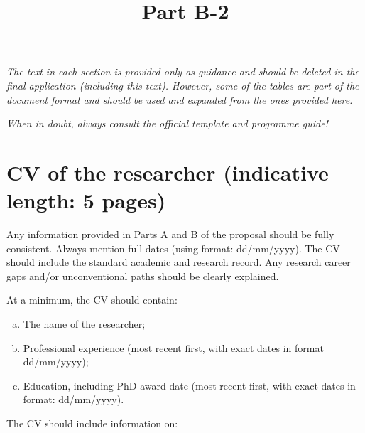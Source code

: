 \documentclass[11pt,draftproposal]{msca-pf}
\title{Part B-2}
\author{}
\date{}
\begin{document}
\maketitle

\textit{The text in each section is provided only as guidance and should be deleted
in the final application (including this text). However, some of the tables
are part of the document format and should be used and expanded from the ones
provided here.}

\textit{When in doubt, always consult the official template and programme guide!}

\section{CV of the researcher (indicative length: 5 pages)}

Any information provided in Parts A and B of the proposal should be fully consistent.
Always mention full dates (using format: dd/mm/yyyy). The CV should include the
standard academic and research record. Any research career gaps and/or unconventional
paths should be clearly explained.

At a minimum, the CV should contain:

\begin{enumerate}[a)]
    \item The name of the researcher;
    \item Professional experience (most recent first, with exact dates in format
    dd/mm/yyyy);
    \item Education, including PhD award date (most recent first, with exact
    dates in format: dd/mm/yyyy).
\end{enumerate}

The CV should include information on:
\end{document}
